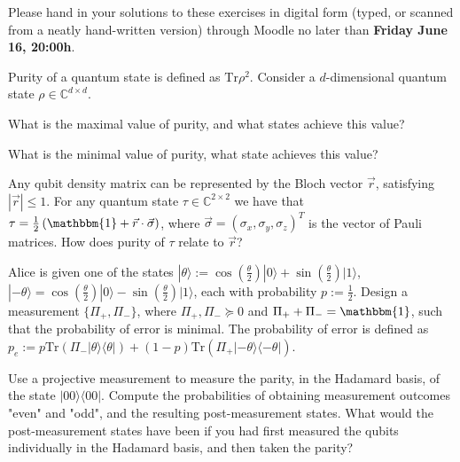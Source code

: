 \documentclass[a4paper,10pt,landscape,twocolumn]{scrartcl}
\newcommand{\ket}[1]{| #1 \rangle}
\newcommand{\proj}[1]{| #1 \rangle \langle #1 |}
\newcommand{\Tr}{\text{Tr}}
\newcommand\deadline{Friday June 16, 20:00h}
\begin{document}
\homeworkproblems

{\sffamily\noindent
Please hand in your solutions to these exercises in digital form (typed, or scanned from a neatly hand-written version) through Moodle no later than \textbf{\deadline}.  %
}


\begin{exercise}[Purity]
Purity of a quantum state is defined as $\Tr\rho^2$. Consider a $d$-dimensional quantum state $\rho\in \mathbb{C}^{d\times d}$.
\begin{subex}
What is the maximal value of purity, and what states achieve this value?
\end{subex}

\begin{subex}
What is the minimal value of purity, what state achieves this value?
\end{subex}

\begin{subex}
Any qubit density matrix can be represented by the Bloch vector $\vec{r}$, satisfying $|\vec{r}|\leq 1$. For any quantum state $\tau\in \mathbb{C}^{2\times 2}$ we have that $\tau= \frac{1}{2}\left( \mathbbm{1} + \vec{r}\cdot \vec{\sigma} \right)$, where $\vec{\sigma}=(\sigma_x,\sigma_y,\sigma_z)^T$ is the vector of Pauli matrices. How does purity of $\tau$ relate to $\vec{r}$?
\end{subex}

\end{exercise}


\begin{exercise}
Alice is given one of the states $\ket{\theta}:=\cos\left(\frac{\theta}{2}\right)\ket{0}+\sin\left(\frac{\theta}{2}\right)\ket{1}$, $\ket{-\theta}=\cos\left(\frac{\theta}{2}\right)\ket{0}-\sin\left(\frac{\theta}{2}\right)\ket{1}$, each with probability $p:=\frac{1}{2}$. Design a measurement $\{ \Pi_{+},\Pi_{-}\}$, where $\Pi_{+},\Pi_{-}\succeq 0$ and $\Pi_{+}+\Pi_{-}= \mathbbm{1}$, such that the probability of error is minimal. The probability of error is defined as $p_e:= p\Tr(\Pi_{-}\proj{\theta})+(1-p)\Tr(\Pi_{+}\proj{-\theta})$.
\end{exercise}




\begin{exercise}
Use a projective measurement to measure the parity, in the Hadamard basis, of
the state $\proj{00}$. Compute the probabilities of obtaining measurement outcomes "even" and
"odd", and the resulting post-measurement states. What would the post-measurement states have
been if you had first measured the qubits individually in the Hadamard basis, and then taken the
parity?
\end{exercise}
\end{document}
